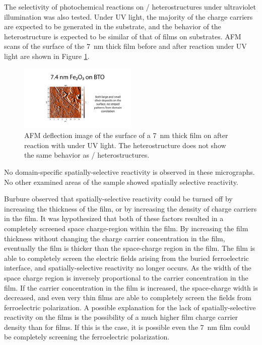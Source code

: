 The selectivity of photochemical reactions on / heterostructures under ultraviolet illumination was also tested. Under UV light, the majority of the charge carriers are expected to be generated in the substrate, and the behavior of the heterostructure is expected to be similar of that of  films on  substrates. AFM scans of the surface of the \SI{7}{\nano\meter} thick film before and after reaction under UV light are shown in Figure \ref{fig:btouv}.
\begin{figure}[htbp]
\begin{center}
\includegraphics[width=0.5\textwidth]{btouv.pdf}
\caption[AFM deflection image reaction on \SI{7}{\nano\meter} thick  film]{AFM deflection image of the surface of a \SI{7}{\nano\meter} thick  film on  after reaction with  under UV light. The heterostructure does not show the same behavior as / heterostructures.}
\label{fig:btouv} %
\end{center}
\end{figure}
No domain-specific spatially-selective reactivity is observed in these micrographs. No other examined areas of the sample showed spatially selective reactivity.

Burbure observed that spatially-selective reactivity could be turned off by increasing the thickness of the film, or by increasing the density of charge carriers in the film. It was hypothesized that both of these factors resulted in a completely screened space charge-region within the film. By increasing the film thickness without changing the charge carrier concentration in the film, eventually the film is thicker than the space-charge region in the film. The film is able to completely screen the electric fields arising from the buried ferroelectric interface, and spatially-selective reactivity no longer occurs. As the width of the space charge region is inversely proportional to the carrier concentration in the film. If the carrier concentration in the film is increased, the space-charge width is decreased, and even very thin films are able to completely screen the fields from ferroelectric polarization. A possible explanation for the lack of spatially-selective reactivity on the  films is the possibility of a much higher film charge carrier density than for  films. If this is the case, it is possible even the \SI{7}{\nano\meter}  film could be completely screening the ferroelectric polarization. 

